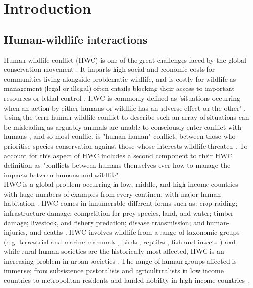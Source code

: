\section{Introduction}

\subsection{Human-wildlife interactions}

Human-wildlife conflict (HWC) is one of the great challenges faced by the global conservation movement \citep{Dickman2010b,Redpath2013}. It imparts high social and economic costs for communities living alongside problematic wildlife, and is costly for wildlife as management (legal or illegal) often entails blocking their access to important resources or lethal control \citep{Dickman2010b,Woodroffe2005}. HWC is commonly defined as 'situations occurring when an action by either humans or wildlife has an adverse effect on the other' \citep{Conover2010a}. Using the term human-wildlife conflict to describe such an array of situations can be misleading as arguably animals are unable to consciously enter conflict with humans \citep{Peterson2010b,Redpath2014b}, and so most conflict is "human-human" conflict, between those who prioritise species conservation against those whose interests wildlife threaten \citep{Peterson2010b,Redpath2014b}. To account for this aspect of HWC \citet{Kansky2016} includes a second component to their HWC definition as "conflicts between humans themselves over how to manage the impacts between humans and wildlife".\\

HWC is a global problem occurring in low, middle, and high income countries \citep{Manfredo2004} with huge numbers of examples from every continent with major human habitation \citep{Dickman2014d,Musiani2005,Palmeira2008,Bagchi2006,Prowse2014,Thirgood2016}. HWC comes in innumerable different forms such as: crop raiding; infrastructure damage; competition for prey species, land, and water; timber damage; livestock, and fishery predation; disease transmission; and human-injuries, and deaths \citep{Arlet2007b,Messmer2000,Conover1997a,woodroffe2005people,Thirgood2005}. HWC involves wildlife from a range of taxonomic groups (e.g. terrestrial and marine mammals \citep{Loe2004a,Butler2015}, birds \citep{Redpath1997}, reptiles \citep{Chaves2015}, fish \citep{Freitas2016} and insects \citep{Cease2015}) and while rural human societies are the historically most affected, HWC is an increasing problem in urban societies \citep{Messmer2000}. The range of human groups affected is immense; from subsistence pastoralists \citep{Dickman2014d} and agriculturalists \citep{Arlet2007b} in low income countries to metropolitan residents \citep{Conover1997a} and landed nobility in high income countries \citep{Redpath1997}.\\

